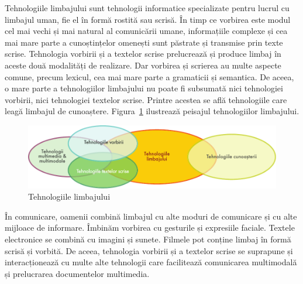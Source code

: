 \begin{multicols}{2}

Tehnologiile limbajului sunt tehnologii informatice specializate pentru lucrul cu limbajul uman, fie el în formă rostită sau scrisă. În timp ce vorbirea este modul cel mai vechi și mai natural al comunicării umane, informațiile complexe și cea mai mare parte a cunoștințelor omenești sunt păstrate și transmise prin texte scrise. Tehnologia vorbirii și a textelor scrise prelucrează și produce limbaj în aceste două modalități de realizare. Dar vorbirea și scrierea au multe aspecte comune, precum lexicul, cea mai mare parte a gramaticii și semantica. De aceea, o mare parte a tehnologiilor limbajului nu poate fi subsumată nici tehnologiei vorbirii, nici tehnologiei textelor scrise. Printre acestea se află tehnologiile care leagă limbajul de cunoaștere. Figura~\ref{fig:ltincontext_de} ilustrează peisajul tehnologiilor limbajului.\vspace*{-0,009cm}

\begin{figure}[htb]
\center
\includegraphics[width=\textwidth]{../_media/romanian/language_technologies}
\caption{Tehnologiile limbajului}
\label{fig:ltincontext_de}
\vspace*{-15mm}
\end{figure}

În comunicare, oamenii combină limbajul cu alte moduri de comunicare și cu alte mijloace de informare. Îmbinăm vorbirea cu gesturile și expresiile faciale. Textele electronice se combină cu imagini și sunete. Filmele pot conține limbaj în formă scrisă și vorbită. De aceea, tehnologia vorbirii și a textelor scrise se suprapune și interacționează cu multe alte tehnologii care facilitează comunicarea multimodală și prelucrarea documentelor multimedia.\vspace*{-0,009cm}


\end{multicols}
